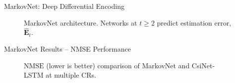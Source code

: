 \documentclass{beamer}
\begin{document}
  \begin{frame}{MarkovNet: Deep Differential Encoding}
    \begin{figure}[!hbtp]
    \centering
    {
      \fontsize{4pt}{6pt}
      \def\svgwidth{0.8\columnwidth}
      
    }
    \caption{MarkovNet architecture. Networks at $t \geq 2$ predict estimation error, $\hat{\mathbf E}_t$.}
    \label{fig:markovnet_schema}
    \end{figure}
  \end{frame}

  \begin{frame}{MarkovNet Results -- NMSE Performance}
    \begin{figure}[!hbtp] \centering 
      \vspace*{-3mm}

      \caption{$\text{NMSE}$ (lower is better) comparison of MarkovNet and CsiNet-LSTM 
      at multiple CRs.} 
      \label{fig:diffnet_result} \vspace*{-2mm}
    \end{figure}  
  \end{frame}
\end{document}

